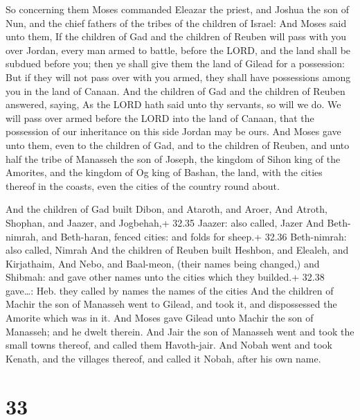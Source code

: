  So concerning them Moses commanded Eleazar the priest, and
Joshua the son of Nun, and the chief fathers of the tribes of the
children of Israel:  And Moses said unto them, If the
children of Gad and the children of Reuben will pass with you over
Jordan, every man armed to battle, before the LORD, and the land shall
be subdued before you; then ye shall give them the land of Gilead for a
possession:  But if they will not pass over with you armed,
they shall have possessions among you in the land of Canaan.
 And the children of Gad and the children of Reuben
answered, saying, As the LORD hath said unto thy servants, so will we
do.  We will pass over armed before the LORD into the land
of Canaan, that the possession of our inheritance on this side Jordan
may be ours.  And Moses gave unto them, even to the
children of Gad, and to the children of Reuben, and unto half the tribe
of Manasseh the son of Joseph, the kingdom of Sihon king of the
Amorites, and the kingdom of Og king of Bashan, the land, with the
cities thereof in the coasts, even the cities of the country round
about.

 And the children of Gad built Dibon, and Ataroth, and
Aroer,  And Atroth, Shophan, and Jaazer, and Jogbehah,+
32.35 Jaazer: also called, Jazer  And Beth-nimrah, and
Beth-haran, fenced cities: and folds for sheep.+ 32.36 Beth-nimrah: also
called, Nimrah  And the children of Reuben built Heshbon,
and Elealeh, and Kirjathaim,  And Nebo, and Baal-meon,
(their names being changed,) and Shibmah: and gave other names unto the
cities which they builded.+ 32.38 gave\ldots: Heb. they called by names
the names of the cities  And the children of Machir the son
of Manasseh went to Gilead, and took it, and dispossessed the Amorite
which was in it.  And Moses gave Gilead unto Machir the son
of Manasseh; and he dwelt therein.  And Jair the son of
Manasseh went and took the small towns thereof, and called them
Havoth-jair.  And Nobah went and took Kenath, and the
villages thereof, and called it Nobah, after his own name.

\hypertarget{section-32}{%
\section{33}\label{section-32}}

